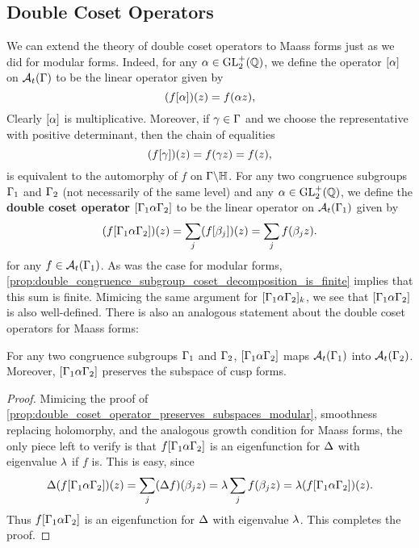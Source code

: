     \subsection*{Double Coset Operators}
      We can extend the theory of double coset operators to Maass forms just as we did for modular forms. Indeed, for any $\alpha \in \mathrm{GL}_{2}^{+}(\mathbb{Q})$, we define the operator $[\alpha]$ on $\mathcal{A}_{t}(\Gamma)$ to be the linear operator given by
      \[
        (f[\alpha])(z) = f(\alpha z),
      \]
      Clearly $[\alpha]$ is multiplicative. Moreover, if $\gamma \in \Gamma$ and we choose the representative with positive determinant, then the chain of equalities
      \[
        (f[\gamma])(z) = f(\gamma z) = f(z),
      \]
      is equivalent to the automorphy of $f$ on $\Gamma\backslash\mathbb{H}$. For any two congruence subgroups $\Gamma_{1}$ and $\Gamma_{2}$ (not necessarily of the same level) and any $\alpha \in \mathrm{GL}_{2}^{+}(\mathbb{Q})$, we define the \textbf{double coset operator} $[\Gamma_{1}\alpha\Gamma_{2}]$ to be the linear operator on $\mathcal{A}_{t}(\Gamma_{1})$ given by
      \[
        (f[\Gamma_{1}\alpha\Gamma_{2}])(z) = \sum_{j}(f[\beta_{j}])(z) = \sum_{j}f(\beta_{j}z).
      \]
      for any $f \in \mathcal{A}_{t}(\Gamma_{1})$. As was the case for modular forms, \cref{prop:double_congruence_subgroup_coset_decomposition_is_finite} implies that this sum is finite. Mimicing the same argument for $[\Gamma_{1}\alpha\Gamma_{2}]_{k}$, we see that $[\Gamma_{1}\alpha\Gamma_{2}]$ is also well-defined. There is also an analogous statement about the double coset operators for Maass forms:

      \begin{proposition}\label{prop:double_coset_operator_preserves_subspaces_Maass}
        For any two congruence subgroups $\Gamma_{1}$ and $\Gamma_{2}$, $[\Gamma_{1}\alpha\Gamma_{2}]$ maps $\mathcal{A}_{t}(\Gamma_{1})$ into $\mathcal{A}_{t}(\Gamma_{2})$. Moreover, $[\Gamma_{1}\alpha\Gamma_{2}]$ preserves the subspace of cusp forms.
      \end{proposition}
      \begin{proof}
        Mimicing the proof of \cref{prop:double_coset_operator_preserves_subspaces_modular}, smoothness replacing holomorphy, and the analogous growth condition for Maass forms, the only piece left to verify is that $f[\Gamma_{1}\alpha\Gamma_{2}]$ is an eigenfunction for $\Delta$ with eigenvalue $\lambda$ if $f$ is. This is easy, since
        \[
          \Delta(f[\Gamma_{1}\alpha\Gamma_{2}])(z) = \sum_{j}(\Delta f)(\beta_{j}z) = \lambda\sum_{j}f(\beta_{j}z) = \lambda(f[\Gamma_{1}\alpha\Gamma_{2}])(z). 
        \]
        Thus $f[\Gamma_{1}\alpha\Gamma_{2}]$ is an eigenfunction for $\Delta$ with eigenvalue $\lambda$. This completes the proof.
      \end{proof}
